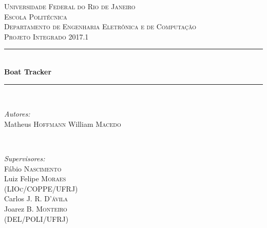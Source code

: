 \begin{titlepage}
\newcommand{\HRule}{\rule{\linewidth}{0.5mm}} %

\center %
 

\textsc{\LARGE Universidade Federal do Rio de Janeiro}\\[1.5cm] %
\textsc{\LARGE Escola Politécnica }\\[1.5cm] %
\textsc{\Large Departamento de Engenharia Eletrônica e de Computação}\\[0.5cm] %
\textsc{\large Projeto Integrado 2017.1}\\[0.5cm] %


\HRule \\[0.4cm]
{ \huge \bfseries Boat Tracker}\\[0.4cm] %
\HRule \\[1.5cm]
 

\begin{minipage}{0.4\textwidth}
\begin{flushleft} \large
\emph{Autores:}\\
Matheus \textsc{Hoffmann}
William \textsc{Macedo}%
\end{flushleft}
\end{minipage}
~
\begin{minipage}{0.4\textwidth}
\begin{flushright} \large
\emph{Supervisores:} \\
Fábio \textsc{Nascimento\\}
Luiz Felipe \textsc{Moraes\\(LIOc/COPPE/UFRJ)\\}
Carlos J. R. \textsc{D'ávila\\}
Joarez B. \textsc{Monteiro\\}
(DEL/POLI/UFRJ)%
\end{flushright}
\end{minipage}\\[2cm]


\end{titlepage}
